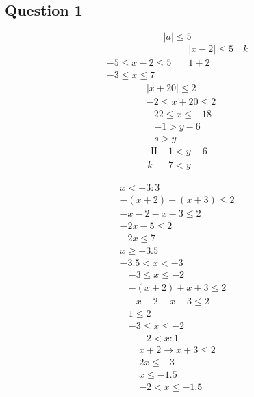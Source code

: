 \documentclass[12pt]{article}
\begin{document}


\subsection*{Question 1}

\[
|a| \leq 5
\]
\[
\begin{aligned}
& |x-2| \leq 5 \quad k \\
-5 \leq x-2 \leq 5 \quad & 1+2 \\
-3 \leq x \leq 7 &
\end{aligned}
\]
\[
\begin{aligned}
& |x+20| \leq 2 \\
& -2 \leq x+20 \leq 2 \\
& -22 \leq x \leq-18
\end{aligned}
\]
\[
\begin{gathered}
-1>y-6 \\
s>y
\end{gathered}
\]
\[
\begin{array}{ll}
\text { II } & 1<y-6 \\
k & 7<y
\end{array}
\]

\[
\begin{gathered}
x<-3: 3 \\
-(x+2)-(x+3) \leq 2 \\
-x-2-x-3 \leq 2 \\
-2 x-5 \leq 2 \\
-2 x \leq 7 \\
x \geq-3.5 \\
-3.5<x<-3
\end{gathered}
\]
\[
\begin{gathered}
-3 \leq x \leq-2 \\
-(x+2)+x+3 \leq 2 \\
-x-2+x+3 \leq 2 \\
1 \leq 2 \\
-3 \leq x \leq-2
\end{gathered}
\]
\[
\begin{gathered}
-2<x: 1 \\
x+2 \rightarrow x+3 \leq 2 \\
2 x \leq-3 \\
x \leq-1.5 \\
-2<x \leq-1.5
\end{gathered}
\]
\end{document}
